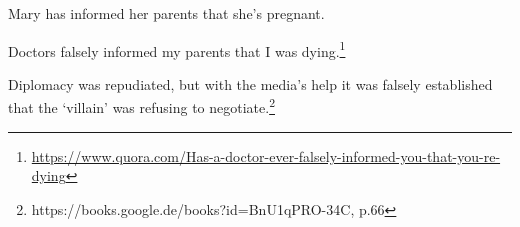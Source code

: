 \documentclass{language}
\def\infelic{{\leavevmode\llap{\#}}}
\newcommand{\6}{\mbox{$[\hspace*{-.6mm}[$}}
\newcommand{\9}{\mbox{$]\hspace*{-.6mm}]$}}
\begin{document}
\begin{exe}
\ex\label{inform} 

\begin{xlist}

\ex Mary has informed her parents that she's pregnant.

\ex Doctors falsely informed my parents that I was dying.\footnote{\footnotesize{\url{https://www.quora.com/Has-a-doctor-ever-falsely-informed-you-that-you-re-dying}}}

\end{xlist}

\ex\label{establish} Diplomacy was repudiated, but with the media's help it was falsely established that the `villain' was refusing to negotiate.\footnote{https://books.google.de/books?id=BnU1qPRO-34C, p.66}
\end{exe}




%
%
%
%
%
%

%
%
%
%
%
\end{document}
